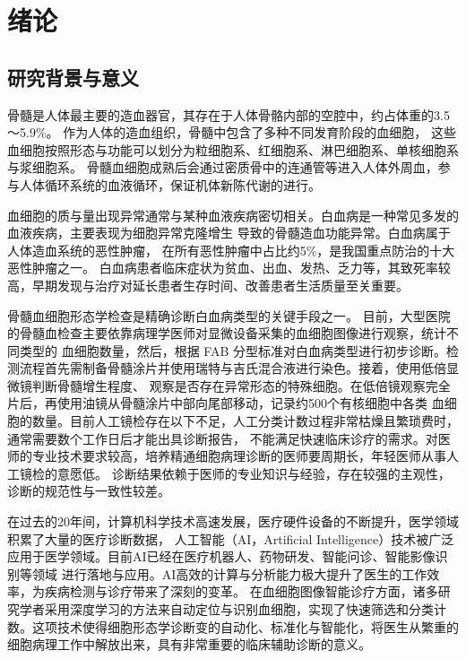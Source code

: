 
\chapter{绪论}
\section{研究背景与意义}
骨髓是人体最主要的造血器官，其存在于人体骨骼内部的空腔中，约占体重的3.5～5.9\%。
作为人体的造血组织，骨髓中包含了多种不同发育阶段的血细胞，
这些血细胞按照形态与功能可以划分为粒细胞系、红细胞系、淋巴细胞系、单核细胞系与浆细胞系。
骨髓血细胞成熟后会通过密质骨中的连通管等进入人体外周血，参与人体循环系统的血液循环，保证机体新陈代谢的进行。

血细胞的质与量出现异常通常与某种血液疾病密切相关。白血病\cite{黄治虎2009我国白血病流行病学调查的现状和对策}是一种常见多发的血液疾病，主要表现为细胞异常克隆增生
导致的骨髓造血功能异常。白血病属于人体造血系统的恶性肿瘤，
在所有恶性肿瘤中占比约5\%，是我国重点防治的十大恶性肿瘤之一。
白血病患者临床症状为贫血、出血、发热、乏力等，其致死率较高，早期发现与治疗对延长患者生存时间、改善患者生活质量至关重要\cite{musto2019update}。

骨髓血细胞形态学检查是精确诊断白血病类型的关键手段之一\cite{heimpel1979conventional}。
目前，大型医院的骨髓血检查主要依靠病理学医师对显微设备采集的血细胞图像进行观察，统计不同类型的
血细胞数量，然后，根据 FAB 分型标准\cite{bennett1976proposals}对白血病类型进行初步诊断。检测流程首先需制备骨髓涂片并使用瑞特与吉氏混合液进行染色。接着，使用低倍显微镜判断骨髓增生程度、
观察是否存在异常形态的特殊细胞。在低倍镜观察完全片后，再使用油镜从骨髓涂片中部向尾部移动，记录约500个有核细胞中各类
血细胞的数量。目前人工镜检存在以下不足，人工分类计数过程非常枯燥且繁琐费时，通常需要数个工作日后才能出具诊断报告，
不能满足快速临床诊疗的需求。对医师的专业技术要求较高，培养精通细胞病理诊断的医师要周期长，年轻医师从事人工镜检的意愿低。
诊断结果依赖于医师的专业知识与经验，存在较强的主观性，诊断的规范性与一致性较差。

在过去的20年间，计算机科学技术高速发展，医疗硬件设备的不断提升，医学领域积累了大量的医疗诊断数据，
人工智能（AI，Artificial Intelligence）技术被广泛应用于医学领域\cite{2018Data,shen2017deep}。目前AI已经在医疗机器人、药物研发、智能问诊、智能影像识别等领域
进行落地与应用。AI高效的计算与分析能力极大提升了医生的工作效率，为疾病检测与诊疗带来了深刻的变革。
在血细胞图像智能诊疗方面，诸多研究学者采用深度学习的方法来自动定位与识别血细胞，实现了快速筛选和分类计数。这项技术使得细胞形态学诊断变的自动化、标准化与智能化，将医生从繁重的细胞病理工作中解放出来，具有非常重要的临床辅助诊断的意义。

